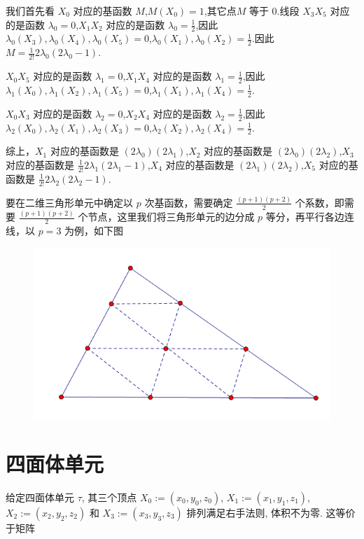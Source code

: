\documentclass[12pt,a4paper]{article}
\begin{document}
我们首先看 $X_0$ 对应的基函数 $M$,$M(X_0)=1$,其它点$M$ 等于 $0$.线段 $X_3 X_5$ 对应的是函数 $\lambda _0=0$,$X_1 X_2$ 对应的是函数 $\lambda _0=\frac{1}{2}$,因此$\lambda_0 (X_3), \lambda_0 (X_4), \lambda_0 (X_5)=0$,$\lambda_0 (X_1), \lambda_0 (X_2)=\frac{1}{2}$.因此$M=\frac{1}{2!}2\lambda_0 (2\lambda_0 -1)$.

$X_0 X_5$ 对应的是函数 $\lambda _1=0$,$X_1 X_4$ 对应的是函数 $\lambda _1=\frac{1}{2}$,因此$\lambda_1 (X_0), \lambda_1 (X_2), \lambda_1 (X_5)=0$,$\lambda_1 (X_1), \lambda_1 (X_4)=\frac{1}{2}$.

$X_0 X_3$ 对应的是函数 $\lambda _2=0$,$X_2 X_4$ 对应的是函数 $\lambda _2=\frac{1}{2}$,因此$\lambda_2 (X_0), \lambda_2 (X_1), \lambda_2 (X_3)=0$,$\lambda_2 (X_2), \lambda_2 (X_4)=\frac{1}{2}$.

综上，$X_1$ 对应的基函数是 $(2\lambda_0)(2\lambda_1)$,$X_2$ 对应的基函数是 $(2\lambda_0)(2\lambda_2)$,$X_3$ 对应的基函数是 $\frac{1}{2!}2\lambda_1 (2\lambda_1 -1)$,$X_4$ 对应的基函数是 $(2\lambda_1)(2\lambda_2)$,$X_5$ 对应的基函数是 $\frac{1}{2!}2\lambda_2 (2\lambda_2 -1)$.

要在二维三角形单元中确定以 $p$ 次基函数，需要确定 $\frac{(p+1)(p+2)}{2}$ 个系数，即需要 $\frac{(p+1)(p+2)}{2}$ 个节点，这里我们将三角形单元的边分成 $p$ 等分，再平行各边连线，以 $p=3$ 为例，如下图
\begin{figure}[H]
\centering
\includegraphics[scale=0.7]{./figures/4.png}
\caption{}
\end{figure}



\section{四面体单元}
给定四面体单元 $\tau$, 其三个顶点 $X_0 :=(x_0, y_0,z_0)$, $X_1 :=(x_1,y_1,z_1)$, $X_2 :=(x_2,y_2,z_2)$ 和 $X_3 :=(x_3, y_3, z_3)$ 排列满足右手法则, 体积不为零. 这等价于矩阵
\end{document}

